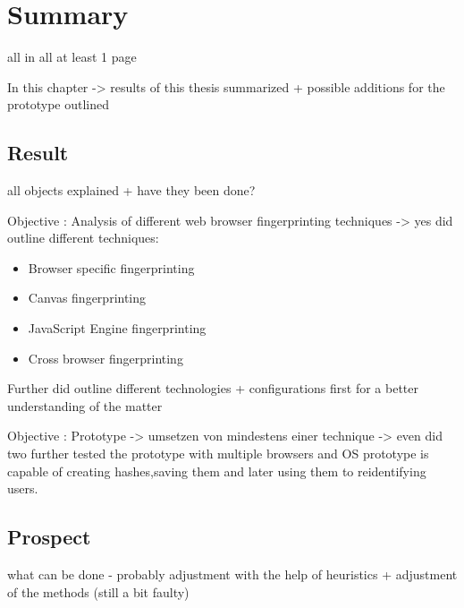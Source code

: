 \chapter{Summary}
\label{cha:summary}
all in all at least 1 page


In this chapter -> results of this thesis summarized + possible additions for the prototype outlined

\section{Result}
all objects explained + have they been done?

Objective : Analysis of different web browser fingerprinting techniques
 -> yes did outline different techniques:
\begin{itemize}
	\item Browser specific fingerprinting
	\item Canvas fingerprinting
	\item JavaScript Engine fingerprinting
	\item Cross browser fingerprinting
\end{itemize}
Further did outline different technologies + configurations first for a better understanding of the matter

Objective : Prototype
-> umsetzen von mindestens einer technique -> even did two
further tested the prototype with multiple browsers and OS
prototype is capable of creating hashes,saving them and later using them to reidentifying users.


\section{Prospect}
what can be done - probably adjustment with the help of heuristics + adjustment of the methods (still a bit faulty)

